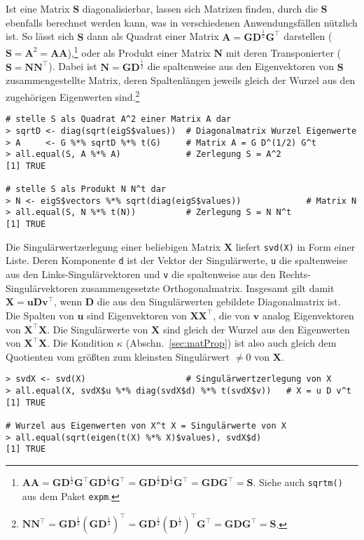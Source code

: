 Ist eine Matrix $\bm{S}$ diagonalisierbar, lassen sich Matrizen finden, durch die $\bm{S}$ ebenfalls berechnet werden kann, was in verschiedenen Anwendungsfällen nützlich ist. So lässt sich $\bm{S}$ dann als Quadrat einer Matrix $\bm{A} = \bm{G} \bm{D}^{\frac{1}{2}} \bm{G}^{\top}$ darstellen ($\bm{S} = \bm{A}^{2} = \bm{A} \bm{A}$),\footnote{$\bm{A} \bm{A} = \bm{G} \bm{D}^{\frac{1}{2}} \bm{G}^{\top} \bm{G} \bm{D}^{\frac{1}{2}} \bm{G}^{\top} = \bm{G} \bm{D}^{\frac{1}{2}} \bm{D}^{\frac{1}{2}} \bm{G}^{\top} = \bm{G} \bm{D} \bm{G}^{\top} = \bm{S}$. Siehe auch \lstinline!sqrtm()! aus dem Paket \lstinline!expm!.} oder als Produkt einer Matrix $\bm{N}$ mit deren Transponierter ($\bm{S} = \bm{N} \bm{N}^{\top}$). Dabei ist $\bm{N} = \bm{G} \bm{D}^{\frac{1}{2}}$ die spaltenweise aus den Eigenvektoren von $\bm{S}$ zusammengestellte Matrix, deren Spaltenlängen jeweils gleich der Wurzel aus den zugehörigen Eigenwerten sind.\footnote{$\bm{N} \bm{N}^{\top} = \bm{G} \bm{D}^{\frac{1}{2}} (\bm{G} \bm{D}^{\frac{1}{2}})^{\top} = \bm{G} \bm{D}^{\frac{1}{2}} (\bm{D}^{\frac{1}{2}})^{\top} \bm{G}^{\top} = \bm{G} \bm{D} \bm{G}^{\top} = \bm{S}$.}
\begin{lstlisting}
# stelle S als Quadrat A^2 einer Matrix A dar
> sqrtD <- diag(sqrt(eigS$values))  # Diagonalmatrix Wurzel Eigenwerte
> A     <- G %*% sqrtD %*% t(G)     # Matrix A = G D^(1/2) G^t
> all.equal(S, A %*% A)             # Zerlegung S = A^2
[1] TRUE

# stelle S als Produkt N N^t dar
> N <- eigS$vectors %*% sqrt(diag(eigS$values))             # Matrix N
> all.equal(S, N %*% t(N))          # Zerlegung S = N N^t
[1] TRUE
\end{lstlisting}

Die Singulärwertzerlegung einer beliebigen Matrix $\bm{X}$ liefert  \lstinline!svd(X)! in Form einer Liste. Deren Komponente \lstinline!d! ist der Vektor der Singulärwerte, \lstinline!u! die spaltenweise aus den Links-Singulärvektoren und \lstinline!v! die spaltenweise aus den Rechts-Singulärvektoren zusammengesetzte Orthogonalmatrix. Insgesamt gilt damit $\bm{X} = \bm{u} \bm{D} \bm{v}^{\top}$, wenn $\bm{D}$ die aus den Singulärwerten gebildete Diagonalmatrix ist. Die Spalten von $\bm{u}$ sind Eigenvektoren von $\bm{X} \bm{X}^{\top}$, die von $\bm{v}$ analog Eigenvektoren von $\bm{X}^{\top} \bm{X}$. Die Singulärwerte von $\bm{X}$ sind gleich der Wurzel aus den Eigenwerten von $\bm{X}^{\top} \bm{X}$. Die Kondition $\kappa$ (Abschn.\ \ref{sec:matProp}) ist also auch gleich dem Quotienten vom größten zum kleinsten Singulärwert $\neq 0$ von $\bm{X}$.
\begin{lstlisting}
> svdX <- svd(X)                    # Singulärwertzerlegung von X
> all.equal(X, svdX$u %*% diag(svdX$d) %*% t(svdX$v))   # X = u D v^t
[1] TRUE

# Wurzel aus Eigenwerten von X^t X = Singulärwerte von X
> all.equal(sqrt(eigen(t(X) %*% X)$values), svdX$d)
[1] TRUE
\end{lstlisting}

